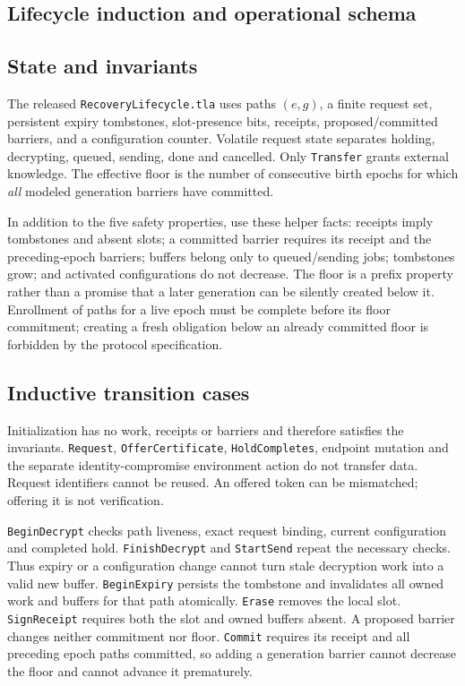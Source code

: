 \documentclass[pdflatex,sn-mathphys-num]{sn-jnl}
\theoremstyle{plain}
\theoremstyle{definition}
\newcommand{\code}[1]{\texttt{#1}}
\begin{document}
\begin{appendices}
\section{Lifecycle induction and operational schema}\label{app:lifecycle}

\subsection{State and invariants}
The released \code{RecoveryLifecycle.tla} uses paths $(e,g)$, a finite request set, persistent expiry tombstones, slot-presence bits, receipts, proposed/committed barriers, and a configuration counter. Volatile request state separates holding, decrypting, queued, sending, done and cancelled. Only \code{Transfer} grants external knowledge. The effective floor is the number of consecutive birth epochs for which \emph{all} modeled generation barriers have committed.

In addition to the five safety properties, use these helper facts: receipts imply tombstones and absent slots; a committed barrier requires its receipt and the preceding-epoch barriers; buffers belong only to queued/sending jobs; tombstones grow; and activated configurations do not decrease. The floor is a prefix property rather than a promise that a later generation can be silently created below it. Enrollment of paths for a live epoch must be complete before its floor commitment; creating a fresh obligation below an already committed floor is forbidden by the protocol specification.

\subsection{Inductive transition cases}
Initialization has no work, receipts or barriers and therefore satisfies the invariants. \code{Request}, \code{OfferCertificate}, \code{HoldCompletes}, endpoint mutation and the separate identity-compromise environment action do not transfer data. Request identifiers cannot be reused. An offered token can be mismatched; offering it is not verification.

\code{BeginDecrypt} checks path liveness, exact request binding, current configuration and completed hold. \code{FinishDecrypt} and \code{StartSend} repeat the necessary checks. Thus expiry or a configuration change cannot turn stale decryption work into a valid new buffer. \code{BeginExpiry} persists the tombstone and invalidates all owned work and buffers for that path atomically. \code{Erase} removes the local slot. \code{SignReceipt} requires both the slot and owned buffers absent. A proposed barrier changes neither commitment nor floor. \code{Commit} requires its receipt and all preceding epoch paths committed, so adding a generation barrier cannot decrease the floor and cannot advance it prematurely.


\end{appendices}
\end{document}
